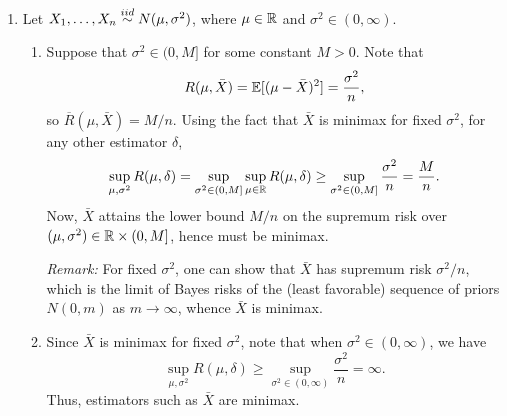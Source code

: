 \documentclass[11pt]{article}
\begin{document}
\begin{enumerate}
        \item Let $X_1, \dots, X_n \overset{iid}{\sim} N(\mu, \sigma^2)$, where $\mu \in \mathbb{R}$
        and $\sigma^2 \in (0, \infty)$.
        \begin{enumerate}
            \item Suppose that $\sigma^2 \in (0, M]$ for some constant $M > 0$.
            Note that \[
                R(\mu, \bar{X})
                    = \mathbb{E}[(\mu - \bar{X})^2]
                    = \frac{\sigma^2}{n},
            \] so $\overline{R}(\mu, \bar{X}) = M / n$.
            Using the fact that $\bar{X}$ is minimax for fixed $\sigma^2$, for
            any other estimator $\delta$, \[
                \sup_{\mu, \sigma^2} R(\mu, \delta)
                    = \sup_{\sigma^2 \in (0, M]} \sup_{\mu \in \mathbb{R}} R(\mu, \delta)
                    \geq \sup_{\sigma^2 \in (0, M]} \frac{\sigma^2}{n}
                    = \frac{M}{n}.
            \] Now, $\bar{X}$ attains the lower bound $M / n$ on the supremum
            risk over $(\mu, \sigma^2) \in \mathbb{R}\times (0, M]$, hence must be
            minimax.

            \emph{Remark:} For fixed $\sigma^2$, one can show that $\bar{X}$
            has supremum risk $\sigma^2 / n$, which is the limit of Bayes risks
            of the (least favorable) sequence of priors $N(0, m)$ as $m \to
            \infty$, whence $\bar{X}$ is minimax.


            \item Since $\bar{X}$ is minimax for fixed $\sigma^2$, note that
            when $\sigma^2 \in (0, \infty)$, we have \[
                \sup_{\mu, \sigma^2} R(\mu, \delta)
                    \geq \sup_{\sigma^2 \in (0, \infty)} \frac{\sigma^2}{n}
                    = \infty.
            \] Thus, estimators such as $\bar{X}$ are minimax.



\end{enumerate}
\end{enumerate}
\end{document}
